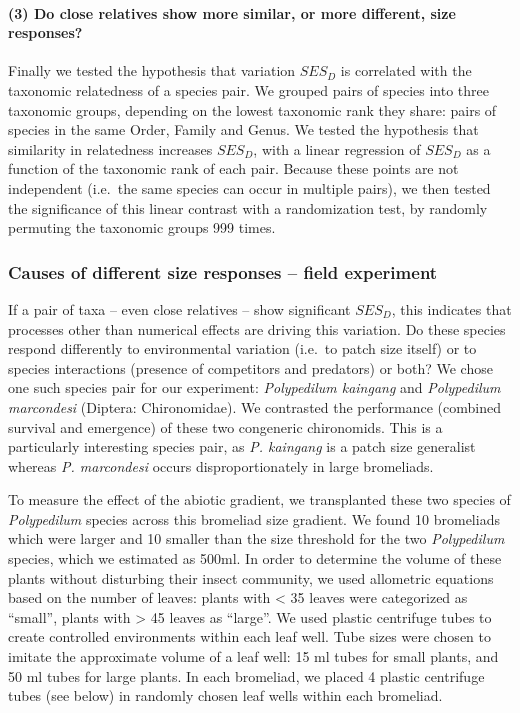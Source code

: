 \paragraph{(3) Do close relatives show more similar, or more different,
size
responses?}\label{do-close-relatives-show-more-similar-or-more-different-size-responses}

Finally we tested the hypothesis that variation \(SES_{D}\) is
correlated with the taxonomic relatedness of a species pair. We grouped
pairs of species into three taxonomic groups, depending on the lowest
taxonomic rank they share: pairs of species in the same Order, Family
and Genus. We tested the hypothesis that similarity in relatedness
increases \(SES_{D}\), with a linear regression of \(SES_{D}\) as a
function of the taxonomic rank of each pair. Because these points are
not independent (i.e.~the same species can occur in multiple pairs), we
then tested the significance of this linear contrast with a
randomization test, by randomly permuting the taxonomic groups 999
times.

\subsubsection{Causes of different size responses -- field
experiment}\label{causes-of-different-size-responses-field-experiment}

If a pair of taxa -- even close relatives -- show significant
\(SES_{D}\), this indicates that processes other than numerical effects
are driving this variation. Do these species respond differently to
environmental variation (i.e.~to patch size itself) or to species
interactions (presence of competitors and predators) or both? We chose
one such species pair for our experiment: \emph{Polypedilum kaingang}
and \emph{Polypedilum marcondesi} (Diptera: Chironomidae). We contrasted
the performance (combined survival and emergence) of these two
congeneric chironomids. This is a particularly interesting species pair,
as \emph{P. kaingang} is a patch size generalist whereas \emph{P.
marcondesi} occurs disproportionately in large bromeliads.

To measure the effect of the abiotic gradient, we transplanted these two
species of \emph{Polypedilum} species across this bromeliad size
gradient. We found 10 bromeliads which were larger and 10 smaller than
the size threshold for the two \emph{Polypedilum} species, which we
estimated as 500ml. In order to determine the volume of these plants
without disturbing their insect community, we used allometric equations
based on the number of leaves: plants with \textless{} 35 leaves were
categorized as ``small'', plants with \textgreater{} 45 leaves as
``large''. We used plastic centrifuge tubes to create controlled
environments within each leaf well. Tube sizes were chosen to imitate
the approximate volume of a leaf well: 15 ml tubes for small plants, and
50 ml tubes for large plants. In each bromeliad, we placed 4 plastic
centrifuge tubes (see below) in randomly chosen leaf wells within each
bromeliad.

